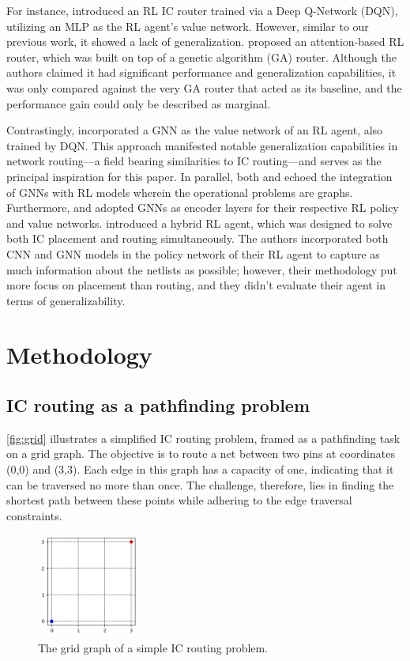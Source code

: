 \documentclass[letterpaper]{article}
\begin{document}
For instance, \cite{Liao2020} introduced an RL IC router trained via a Deep
Q-Network (DQN), utilizing an MLP as the RL agent's
value network. However, similar to our previous work, it showed a lack of
generalization. \cite{liao2020attention} proposed an attention-based RL router,
which was built on top of a genetic algorithm (GA) router. Although the authors
claimed it had significant performance and generalization capabilities, it was
only compared against the very GA router that acted as its baseline, and the
performance gain could only be described as marginal.

Contrastingly, \cite{Almasan2022} incorporated a GNN as the value network of an
RL agent, also trained by DQN. This approach manifested notable generalization
capabilities in network routing—a field bearing similarities to IC routing—and
serves as the principal inspiration for this paper. In parallel, both
\cite{Chen2023} and \cite{Wang2018} echoed the integration of GNNs with RL
models wherein the operational problems are graphs. Furthermore,
\cite{Mirhoseini2021} and \cite{Yue2022} adopted GNNs as encoder layers for
their respective RL policy and value networks. \cite{Cheng2021} introduced a
hybrid RL agent, which was designed to solve both IC placement and routing
simultaneously. The authors incorporated both CNN and GNN models in the policy
network of their RL agent to capture as much information about the netlists as
possible; however, their methodology put more focus on placement than routing,
and they didn't evaluate their agent in terms of generalizability.

    
\section{Methodology}

\subsection{IC routing as a pathfinding problem}
\autoref{fig:grid} illustrates a simplified IC routing problem, framed as a pathfinding task on a grid graph. The objective is to route a net between two pins at coordinates (0,0) and (3,3). Each edge in this graph has a capacity of one, indicating that it can be traversed no more than once. The challenge, therefore, lies in finding the shortest path between these points while adhering to the edge traversal constraints.

\begin{figure}[h!]
    \centering
    \includegraphics[width=0.3\textwidth]{figure/grid_grap.png}
    \caption{The grid graph of a simple IC routing problem.}
    \label{fig:grid}
\end{figure}
\end{document}
